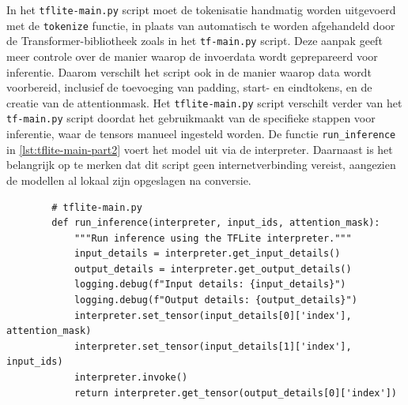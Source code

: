 In het \texttt{tflite-main.py} script moet de tokenisatie handmatig worden uitgevoerd met de \texttt{tokenize} functie, in plaats van automatisch te worden afgehandeld door de Transformer-bibliotheek zoals in het \texttt{tf-main.py} script. Deze aanpak geeft meer controle over de manier waarop de invoerdata wordt geprepareerd voor inferentie. Daarom verschilt het script ook in de manier waarop data wordt voorbereid, inclusief de toevoeging van padding, start- en eindtokens, en de creatie van de \gls{attentionmask}.
Het \texttt{tflite-main.py} script verschilt verder van het \texttt{tf-main.py} script doordat het gebruikmaakt van de  specifieke stappen voor inferentie, waar de \glspl{tensor} manueel ingesteld worden. De functie \texttt{run\_inference} in \ref{lst:tflite-main-part2} voert het model uit via de  interpreter. Daarnaast is het belangrijk op te merken dat dit script geen internetverbinding vereist, aangezien de modellen al lokaal zijn opgeslagen na conversie.


\begin{listing}
    \begin{verbatim}
        # tflite-main.py
        def run_inference(interpreter, input_ids, attention_mask):
            """Run inference using the TFLite interpreter."""
            input_details = interpreter.get_input_details()
            output_details = interpreter.get_output_details()
            logging.debug(f"Input details: {input_details}")
            logging.debug(f"Output details: {output_details}")
            interpreter.set_tensor(input_details[0]['index'], attention_mask)
            interpreter.set_tensor(input_details[1]['index'], input_ids)
            interpreter.invoke()
            return interpreter.get_tensor(output_details[0]['index'])
    \end{verbatim}
    \caption[\texttt{tflite-main.py} (deel 2)]{Het tweede deel van \texttt{tflite-main.py} behandelt de uitvoering van inferentie met de  interpreter, waarbij de invoer en uitvoer handmatig worden ingesteld via de \glspl{tensor}.}
    \label{lst:tflite-main-part2}
\end{listing}

